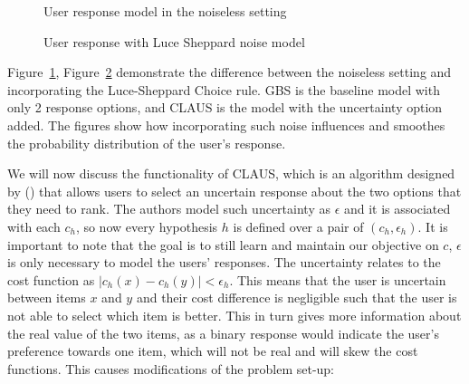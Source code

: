 \documentclass[
  letterpaper,
  numbers=noenddot,
  DIV=11]{scrreprt}
\theoremstyle{plain}
\theoremstyle{definition}
\theoremstyle{remark}
\begin{document}
\begin{figure}


\caption{\label{fig-noiseless_1}User response model in the noiseless
setting}

\end{figure}%

\begin{figure}


\caption{\label{fig-noiseless_2}User response with Luce Sheppard noise
model}

\end{figure}%

Figure~\ref{fig-noiseless_1}, Figure~\ref{fig-noiseless_2} demonstrate
the difference between the noiseless setting and incorporating the
Luce-Sheppard Choice rule. GBS is the baseline model with only 2
response options, and CLAUS is the model with the uncertainty option
added. The figures show how incorporating such noise influences and
smoothes the probability distribution of the user's response.

We will now discuss the functionality of CLAUS, which is an algorithm
designed by () that allows
users to select an uncertain response about the two options that they
need to rank. The authors model such uncertainty as \(\epsilon\) and it
is associated with each \(c_h\), so now every hypothesis \(h\) is
defined over a pair of \((c_h, \epsilon_h)\). It is important to note
that the goal is to still learn and maintain our objective on \(c\),
\(\epsilon\) is only necessary to model the users' responses. The
uncertainty relates to the cost function as
\(|c_h(x) - c_h(y)| < \epsilon_h\). This means that the user is
uncertain between items \(x\) and \(y\) and their cost difference is
negligible such that the user is not able to select which item is
better. This in turn gives more information about the real value of the
two items, as a binary response would indicate the user's preference
towards one item, which will not be real and will skew the cost
functions. This causes modifications of the problem set-up:
\end{document}

